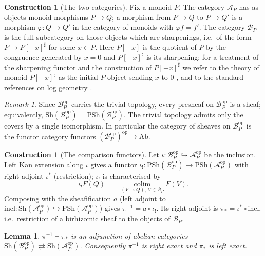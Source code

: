 \documentclass[11pt]{article}
\newtheorem{lemma}[theorem]{Lemma}
\theoremstyle{definition}
\newtheorem{construction}[theorem]{Construction}
\theoremstyle{remark}
\newtheorem{remark}[theorem]{Remark}
\newcommand{\Sh}{\mathrm{Sh}}
\newcommand{\PSh}{\mathrm{PSh}}
\newcommand{\Ab}{\mathrm{Ab}}
\newcommand{\Acal}{\mathcal{A}}
\newcommand{\Bcal}{\mathcal{B}}
\newcommand{\op}{\mathrm{op}}
\begin{document}
\begin{construction}[The two categories]\label{con:cats}
Fix a monoid $P$.  The category $\Acal_P$ has as objects monoid morphisms
$P \to Q$; a morphism from $P \to Q$ to $P \to Q'$ is a morphism
$\varphi : Q \to Q'$ in the category of monoids with $\varphi f = f'$.  The
category $\Bcal_P$ is the full subcategory on those objects which are
sharpenings, i.e.\ of the form $P \to P[-x]^{\sharp}$ for some $x \in P$.  Here
$P[-x]$ is the quotient of $P$ by the congruence generated by $x = 0$ and
$P[-x]^{\sharp}$ is its sharpening; for a treatment of the sharpening functor
and the construction of $P[-x]^{\sharp}$ we refer to the theory of monoid
$P[-x]^{\sharp}$ as the initial $P$-object sending $x$ to $0$
\cite[{\S}1--2]{Holmes}, and to the standard references on log geometry
\cite{Kat89, Ogus18}.
\end{construction}

\begin{remark}\label{rmk:sharptriv}
Since $\Bcal_P^{\op}$ carries the trivial topology, every presheaf on
$\Bcal_P^{\op}$ is a sheaf; equivalently,
$\Sh(\Bcal_P^{\op}) = \PSh(\Bcal_P^{\op})$.  The trivial topology admits only
the covers by a single isomorphism.  In particular the category of sheaves on
$\Bcal_P^{\op}$ is the functor category functors $(\Bcal_P^{\op})^{\op} \to
\Ab$.
\end{remark}

\begin{construction}[The comparison functors]\label{con:comparison}
Let $\iota : \Bcal_P^{\op} \hookrightarrow \Acal_P^{\op}$ be the inclusion.
Left Kan extension along $\iota$ gives a functor
$\iota_! : \PSh(\Bcal_P^{\op}) \to \PSh(\Acal_P^{\op})$ with right adjoint
$\iota^*$ (restriction); $\iota_!$ is characterised by
\[
  \iota_! F (Q) \;=\; \operatorname*{colim}_{(V \to Q),\ V \in \Bcal_P} F(V).
\]
Composing with the sheafification $a$ (left adjoint to
$\mathrm{incl} : \Sh(\Acal_P^{\op}) \hookrightarrow \PSh(\Acal_P^{\op})$) gives
$\pi^{-1} = a \circ \iota_!$.  Its right adjoint is
$\pi_* = \iota^* \circ \mathrm{incl}$, i.e.\ restriction of a birhizomic sheaf
to the objects of $\Bcal_P$.
\end{construction}

\begin{lemma}\label{lem:adjunction}
$\pi^{-1} \dashv \pi_*$ is an adjunction of abelian categories
$\Sh(\Bcal_P^{\op}) \rightleftarrows \Sh(\Acal_P^{\op})$.  Consequently
$\pi^{-1}$ is right exact and $\pi_*$ is left exact.
\end{lemma}
\end{document}

